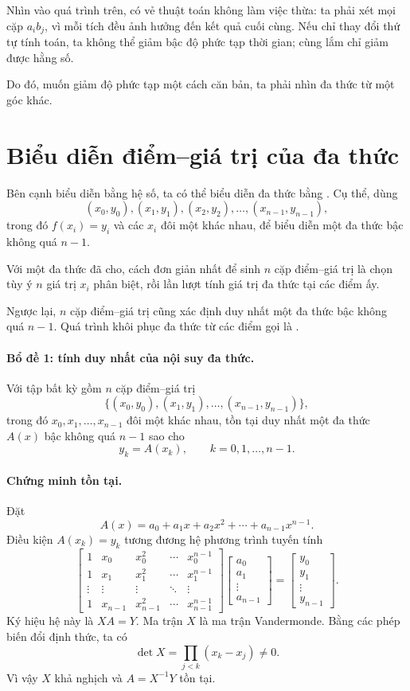 \documentclass[11pt]{article}
\begin{document}
Nhìn vào quá trình trên, có vẻ thuật toán không làm việc thừa: ta phải xét
mọi cặp \(a_i b_j\), vì mỗi tích đều ảnh hưởng đến kết quả cuối cùng. Nếu
chỉ thay đổi thứ tự tính toán, ta không thể giảm bậc độ phức tạp thời gian;
cùng lắm chỉ giảm được hằng số.

Do đó, muốn giảm độ phức tạp một cách căn bản, ta phải nhìn đa thức từ một
góc khác.

\section{Biểu diễn điểm--giá trị của đa thức}

Bên cạnh biểu diễn bằng hệ số, ta có thể biểu diễn đa thức bằng
. Cụ thể, dùng
\[
  (x_0,y_0),(x_1,y_1),(x_2,y_2),\ldots,(x_{n-1},y_{n-1}),
\]
trong đó \(f(x_i)=y_i\) và các \(x_i\) đôi một khác nhau, để biểu diễn một đa
thức bậc không quá \(n-1\).

Với một đa thức đã cho, cách đơn giản nhất để sinh \(n\) cặp điểm--giá trị
là chọn tùy ý \(n\) giá trị \(x_i\) phân biệt, rồi lần lượt tính giá trị đa
thức tại các điểm ấy.

Ngược lại, \(n\) cặp điểm--giá trị cũng xác định duy nhất một đa thức bậc
không quá \(n-1\). Quá trình khôi phục đa thức từ các điểm gọi là
.

\paragraph{Bổ đề 1: tính duy nhất của nội suy đa thức.}
Với tập bất kỳ gồm \(n\) cặp điểm--giá trị
\[
  \{(x_0,y_0),(x_1,y_1),\ldots,(x_{n-1},y_{n-1})\},
\]
trong đó \(x_0,x_1,\ldots,x_{n-1}\) đôi một khác nhau, tồn tại duy nhất một
đa thức \(A(x)\) bậc không quá \(n-1\) sao cho
\[
  y_k=A(x_k),\qquad k=0,1,\ldots,n-1.
\]

\paragraph{Chứng minh tồn tại.}
Đặt
\[
  A(x)=a_0+a_1x+a_2x^2+\cdots+a_{n-1}x^{n-1}.
\]
Điều kiện \(A(x_k)=y_k\) tương đương hệ phương trình tuyến tính
\[
\begin{bmatrix}
1 & x_0 & x_0^2 & \cdots & x_0^{n-1}\\
1 & x_1 & x_1^2 & \cdots & x_1^{n-1}\\
\vdots & \vdots & \vdots & \ddots & \vdots\\
1 & x_{n-1} & x_{n-1}^2 & \cdots & x_{n-1}^{n-1}
\end{bmatrix}
\begin{bmatrix}
a_0\\ a_1\\ \vdots\\ a_{n-1}
\end{bmatrix}
=
\begin{bmatrix}
y_0\\ y_1\\ \vdots\\ y_{n-1}
\end{bmatrix}.
\]
Ký hiệu hệ này là \(XA=Y\). Ma trận \(X\) là ma trận Vandermonde. Bằng các
phép biến đổi định thức, ta có
\[
  \det X=\prod_{j<k}(x_k-x_j)\ne0.
\]
Vì vậy \(X\) khả nghịch và \(A=X^{-1}Y\) tồn tại.
\end{document}
